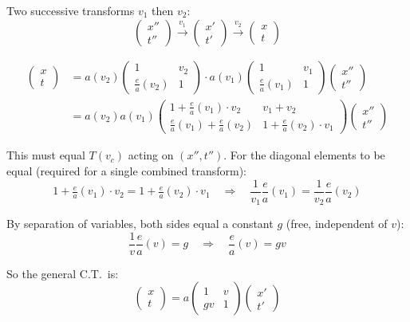 Two successive transforms $v_1$ then $v_2$:
\[
  \begin{pmatrix}x''\\t''\end{pmatrix}
  \xrightarrow{v_1}
  \begin{pmatrix}x'\\t'\end{pmatrix}
  \xrightarrow{v_2}
  \begin{pmatrix}x\\t\end{pmatrix}
\]

\begin{align*}
  \begin{pmatrix}x\\t\end{pmatrix}
  &= a(v_2)\begin{pmatrix}1&v_2\\[3pt]\frac{e}{a}(v_2)&1\end{pmatrix}
    \cdot
    a(v_1)\begin{pmatrix}1&v_1\\[3pt]\frac{e}{a}(v_1)&1\end{pmatrix}
    \begin{pmatrix}x''\\t''\end{pmatrix} \\[6pt]
  &= a(v_2)a(v_1)
    \begin{pmatrix}
      1+\frac{e}{a}(v_1)\cdot v_2 & v_1+v_2 \\[4pt]
      \frac{e}{a}(v_1)+\frac{e}{a}(v_2) & 1+\frac{e}{a}(v_2)\cdot v_1
    \end{pmatrix}
    \begin{pmatrix}x''\\t''\end{pmatrix}
\end{align*}

This must equal $T(v_c)$ acting on $(x'',t'')$.
For the diagonal elements to be equal (required for a single combined transform):
\[
  1 + \tfrac{e}{a}(v_1)\cdot v_2 = 1 + \tfrac{e}{a}(v_2)\cdot v_1
  \quad\Rightarrow\quad
  \frac{1}{v_1}\frac{e}{a}(v_1) = \frac{1}{v_2}\frac{e}{a}(v_2)
\]

By separation of variables, both sides equal a constant $g$ (free, independent of $v$):
\[
  \frac{1}{v}\frac{e}{a}(v) = g
  \quad\Rightarrow\quad
  \frac{e}{a}(v) = gv
\]

So the general C.T.\ is:
\[
  \begin{pmatrix}x\\t\end{pmatrix}
  = a\begin{pmatrix}1 & v \\ gv & 1\end{pmatrix}
  \begin{pmatrix}x'\\t'\end{pmatrix}
\]


